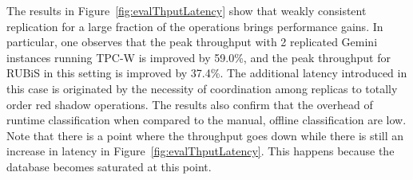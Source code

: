 The results in Figure~\ref{fig:evalThputLatency} show that weakly consistent replication for a large
fraction of the operations brings performance gains. In particular, one
observes that the peak throughput with 2 replicated Gemini instances
running TPC-W is improved by 59.0\%, and the peak throughput for
RUBiS in this setting is improved by 37.4\%. %
The additional latency
introduced in this case is originated by the necessity of coordination
among replicas to totally order red shadow operations. The results
also confirm that the overhead of runtime classification when compared
to the manual, offline classification are low. Note that there is a
point where the throughput goes down while there is still an increase
in latency in Figure~\ref{fig:evalThputLatency}. This happens
because the database becomes saturated at this point.
